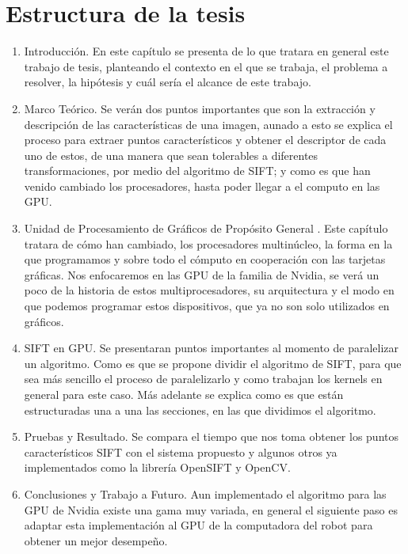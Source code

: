 \section{Estructura de la tesis}
\begin{enumerate}




\item Introducción. En este capítulo se presenta de lo que tratara en general este trabajo de tesis, planteando el contexto en el que se trabaja, el problema a resolver, la hipótesis y cuál sería el alcance de este trabajo.\\

\item Marco Teórico. Se verán dos puntos importantes que son la extracción y descripción de las características de una imagen, aunado a esto  se explica el proceso para extraer puntos característicos y obtener el descriptor de cada uno de estos, de una manera que sean tolerables a diferentes transformaciones, por medio del algoritmo de SIFT; y como es que han venido cambiado los procesadores, hasta poder llegar a el computo en las GPU.\\


\item Unidad de Procesamiento de Gráficos de Propósito General .  Este capítulo tratara de cómo han cambiado, los procesadores multinúcleo, la forma en la que programamos y sobre todo el cómputo en cooperación con las tarjetas gráficas. Nos enfocaremos en las GPU de la familia de Nvidia, se verá un poco de la historia de estos multiprocesadores, su arquitectura y el modo en que podemos programar estos dispositivos, que ya no son solo utilizados en gráficos.\\


\item SIFT en GPU. Se presentaran puntos importantes al momento de paralelizar un algoritmo.
Como es que se propone dividir el algoritmo de SIFT, para que sea más sencillo el proceso de paralelizarlo y como trabajan los kernels en general para este caso.
Más adelante se explica como es que están estructuradas una a una las secciones, en las que dividimos el algoritmo.\\


\item Pruebas y Resultado. Se compara el tiempo que nos toma obtener los puntos característicos SIFT con el sistema propuesto y algunos otros ya implementados como la librería OpenSIFT y OpenCV.\\

\item Conclusiones y Trabajo a Futuro. Aun implementado el algoritmo para las GPU de Nvidia existe una gama muy variada, en general el siguiente paso es adaptar esta implementación al GPU de la computadora del robot para obtener un mejor desempeño.\\

\end{enumerate}






